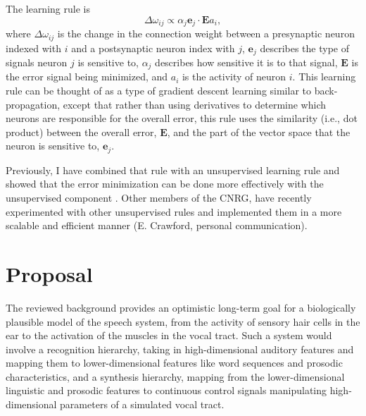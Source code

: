 \documentclass{article}
\begin{document}
The learning rule is
\begin{equation}
  \Delta \omega_{ij} \propto \alpha_j \mathbf{e}_j \cdot \mathbf{E} a_i,
\end{equation}
where $\Delta \omega_{ij}$ is the change in
the connection weight between
a presynaptic neuron indexed with $i$
and a postsynaptic neuron index with $j$,
$\mathbf{e}_j$ describes the type of signals
neuron $j$ is sensitive to,
$\alpha_j$ describes how sensitive
it is to that signal,
$\mathbf{E}$ is the error signal being minimized,
and $a_i$ is the activity of neuron $i$.
This learning rule can be thought of
as a type of gradient descent learning
similar to back-propagation,
except that rather than using
derivatives to determine which
neurons are responsible for the overall error,
this rule uses the similarity (i.e., dot product)
between the overall error, $\mathbf{E}$,
and the part of the vector space
that the neuron is sensitive to, $\mathbf{e}_j$.

Previously, I have combined that rule
with an unsupervised learning rule
and showed that the error minimization
can be done more effectively with
the unsupervised component
\citep{bekolay2013}.
Other members of the CNRG,
have recently experimented
with other unsupervised rules
and implemented them
in a more scalable and efficient manner
(E. Crawford, personal communication).

\section{Proposal}
\label{sec:proposal}

The reviewed background
provides an optimistic long-term
goal for a biologically plausible
model of the speech system,
from the activity of sensory
hair cells in the ear
to the activation of
the muscles in the vocal tract.
Such a system would involve
a recognition hierarchy,
taking in high-dimensional auditory features
and mapping them to lower-dimensional
features like word sequences
and prosodic characteristics,
and a synthesis hierarchy,
mapping from the lower-dimensional
linguistic and prosodic features
to continuous control signals
manipulating high-dimensional parameters
of a simulated vocal tract.
\end{document}
